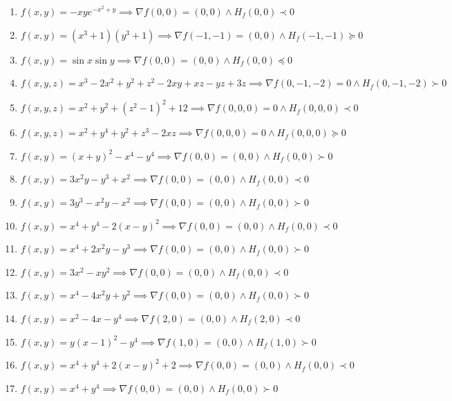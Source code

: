 \documentclass[11pt,a4paper]{article}
\begin{document}
\begin{enumerate}
\item $\displaystyle f(x, y) = -xy e^{-x^{2} + y} \implies \nabla f(0, 0) = (0, 0) \land H_{f}(0, 0) \prec 0$
\item $\displaystyle f(x, y) = (x^{3} + 1)(y^{3} + 1) \implies \nabla f(-1, -1) = (0, 0) \land H_{f}(-1, -1) \succeq 0$
\item $\displaystyle f(x, y) = \sin x \sin y \implies \nabla f(0, 0) = (0, 0) \land H_{f}(0, 0) \preceq 0$
\item $\displaystyle f(x, y, z) = x^{3} - 2x^{2} + y^{2} + z^{2} - 2xy + xz - yz + 3z \implies \nabla f(0, -1, -2) = 0 \land H_{f}(0, -1, -2) \succ 0$
\item $\displaystyle f(x, y, z) = x^{2} + y^{2} + (z^{2} - 1)^{2} + 12 \implies \nabla f(0, 0, 0) = 0 \land H_{f}(0, 0, 0) \prec 0$
\item $\displaystyle f(x, y, z) = x^{2} + y^{4} + y^{2} + z^{3} - 2xz \implies \nabla f(0, 0, 0) = 0 \land H_{f}(0, 0, 0) \succeq 0$
\item $\displaystyle f(x, y) = (x + y)^{2} - x^{4} - y^{4} \implies \nabla f(0, 0) = (0, 0) \land H_{f}(0, 0) \succ 0$
\item $\displaystyle f(x, y) = 3x^{2} y - y^{3} + x^{2} \implies \nabla f(0, 0) = (0, 0) \land H_{f}(0, 0) \prec 0$
\item $\displaystyle f(x, y) = 3y^{3} - x^{2} y - x^{2} \implies \nabla f(0, 0) = (0, 0) \land H_{f}(0, 0) \succ 0$
\item $\displaystyle f(x, y) = x^{4} + y^{4} - 2(x - y)^{2} \implies \nabla f(0, 0) = (0, 0) \land H_{f}(0, 0) \prec 0$
\item $\displaystyle f(x, y) = x^{4} + 2x^{2} y - y^{3} \implies \nabla f(0, 0) = (0, 0) \land H_{f}(0, 0) \succ 0$
\item $\displaystyle f(x, y) = 3x^{2} - x y^{2} \implies \nabla f(0, 0) = (0, 0) \land H_{f}(0, 0) \prec 0$
\item $\displaystyle f(x, y) = x^{4} - 4x^{2} y + y^{2} \implies \nabla f(0, 0) = (0, 0) \land H_{f}(0, 0) \succ 0$
\item $\displaystyle f(x, y) = x^{2} - 4x - y^{4} \implies \nabla f(2, 0) = (0, 0) \land H_{f}(2, 0) \prec 0$
\item $\displaystyle f(x, y) = y(x - 1)^{2} - y^{4} \implies \nabla f(1, 0) = (0, 0) \land H_{f}(1, 0) \succ 0$
\item $\displaystyle f(x, y) = x^{4} + y^{4} + 2(x - y)^{2} + 2 \implies \nabla f(0, 0) = (0, 0) \land H_{f}(0, 0) \prec 0$
\item $\displaystyle f(x, y) = x^{4} + y^{4} \implies \nabla f(0, 0) = (0, 0) \land H_{f}(0, 0) \succ 0$

\end{enumerate}
\end{document}
